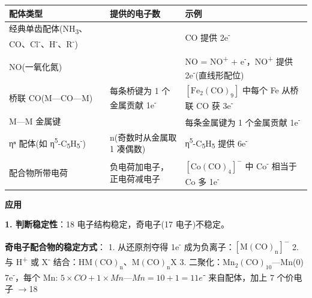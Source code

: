 \documentclass[a4paper,11pt]{ctexart}
\newcounter{none}
\newcommand{\箭}{\ensuremath{\rightarrow}}
\newcommand{\左箭}{\ensuremath{\leftarrow}}
\newcommand{\上箭}{\ensuremath{\uparrow}}
\newcommand{\下箭}{\ensuremath{\downarrow}}
\newcommand{\衡}{\ensuremath{\rightleftharpoons}}
\newcommand{\双箭}{\ensuremath{\leftrightarrow}}
\newcommand{\约等于}{\ensuremath{\approx}}
\newcommand{\小于等于}{\ensuremath{\leq}}
\newcommand{\大于等于}{\ensuremath{\geq}}
\newcommand{\不等于}{\ensuremath{\neq}}
\newcommand{\西格马}{\ensuremath{\sigma}}
\newcommand{\派}{\ensuremath{\pi}}
\begin{document}
{\def\LTcaptype{none} %
\begin{longtable}[]{@{}
  >{\raggedright\arraybackslash}p{}
  >{\centering\arraybackslash}p{}
  >{\raggedright\arraybackslash}p{}@{}}
\toprule\noalign{}
\begin{minipage}[b]{\linewidth}\raggedright
配体类型
\end{minipage} & \begin{minipage}[b]{\linewidth}\centering
提供的电子数
\end{minipage} & \begin{minipage}[b]{\linewidth}\raggedright
示例
\end{minipage} \\
\midrule\noalign{}
\endhead
\bottomrule\noalign{}
\endlastfoot
经典单齿配体(NH\textsubscript{3}、CO、Cl\textsuperscript{-}、H\textsuperscript{-}、R\textsuperscript{-}) & 2 & CO 提供 2e\textsuperscript{-} \\
NO(一氧化氮) & 3 & NO = NO\textsuperscript{+} + e\textsuperscript{-}，NO\textsuperscript{+} 提供 2e\textsuperscript{-}(直线形配位) \\
桥联 CO(M---CO---M) & 每条桥键为 1 个金属贡献 1e\textsuperscript{-} & \([\mathrm{Fe_2(CO)_9}]\) 中每个 Fe 从桥联 CO 获 3e\textsuperscript{-} \\
M---M 金属键 & 1 & 每条金属键为 1 个金属贡献 1e\textsuperscript{-} \\
ηⁿ 配体(如 η\textsuperscript{5}-C\textsubscript{5}H\textsubscript{5}\textsuperscript{-}) & n(奇数时从金属取 1 凑偶数) & η\textsuperscript{5}-C\textsubscript{5}H\textsubscript{5} 提供 6e\textsuperscript{-} \\
配合物所带电荷 & 负电荷加电子，正电荷减电子 & \([\mathrm{Co(CO)_4}]^-\) 中 Co\textsuperscript{-} 相当于 Co 多 1e\textsuperscript{-} \\
\end{longtable}
}

\textbf{应用}

\textbf{1. 判断稳定性}：18 电子结构稳定，奇电子(17 电子)不稳定。

\textbf{奇电子配合物的稳定方式}：
1. 从还原剂夺得 1e\textsuperscript{-} 成为负离子：\([\mathrm{M(CO)_n}]^-\)
2. 与 H\textsuperscript{+} 或 X\textsuperscript{-} 结合：\(\mathrm{HM(CO)_n}\)、\(\mathrm{M(CO)_nX}\)
3. 二聚化：\(\mathrm{Mn_2(CO)_{10}}\)---Mn(0) 7e\textsuperscript{-}，每个 Mn: \(5 \times CO + 1 \times Mn—Mn = 10 + 1 = 11e⁻\) 来自配体，加上 7 个价电子 \箭 18
\end{document}
